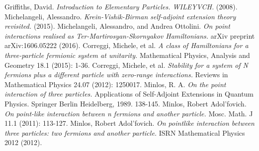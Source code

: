 \documentclass[11pt, a4paper, german]{article}
\theoremstyle{plain}
\theoremstyle{definition}
\theoremstyle{remark}
\numberwithin{equation}{section}
\numberwithin{theorem}{section}
\begin{document}
\begin{thebibliography}{1}
Griffiths, David. \textit{Introduction to Elementary Particles. WILEYVCH.} (2008).
Michelangeli, Alessandro. \textit{Krein-Vishik-Birman self-adjoint extension theory revisited.} (2015).
Michelangeli, Alessandro, and Andrea Ottolini. \textit{On point interactions realised as Ter-Martirosyan-Skornyakov Hamiltonians.} arXiv preprint arXiv:1606.05222 (2016).
Correggi, Michele, et al. \textit{A class of Hamiltonians for a three-particle fermionic system at unitarity.} Mathematical Physics, Analysis and Geometry 18.1 (2015): 1-36.
Correggi, Michele, et al. \textit{Stability for a system of N fermions plus a different particle with zero-range interactions.} Reviews in Mathematical Physics 24.07 (2012): 1250017.
Minlos, R. A. \textit{On the point interaction of three particles.} Applications of Self-Adjoint Extensions in Quantum Physics. Springer Berlin Heidelberg, 1989. 138-145.
Minlos, Robert Adol'fovich. \textit{On point-like interaction between n fermions and another particle.} Mosc. Math. J 11.1 (2011): 113-127.
Minlos, Robert Adol'fovich. \textit{On pointlike interaction between three particles: two fermions and another particle.} ISRN Mathematical Physics 2012 (2012).
\end{thebibliography}
\end{document}
